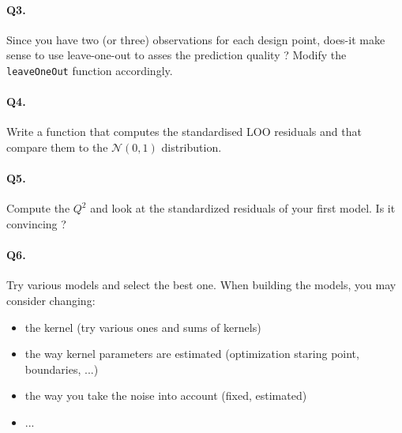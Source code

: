 \documentclass[12pt]{scrartcl}
\begin{document}
\paragraph{Q3.} 
Since you have two (or three) observations for each design point, does-it make sense to use leave-one-out to asses the prediction quality ? Modify the \texttt{leaveOneOut} function accordingly.

\paragraph{Q4.} 
Write a function that computes the standardised LOO residuals and that compare them to the $\mathcal{N}(0,1)$ distribution.

\paragraph{Q5.} Compute the $Q^2$ and look at the standardized residuals of your first model. Is it convincing ?

\paragraph{Q6.} Try various models and select the best one. When building the models, you may consider changing:
\begin{itemize}
   	\item the kernel (try various ones and sums of kernels)
   	\item the way kernel parameters are estimated (optimization staring point, boundaries, ...)
   	\item the way you take the noise into account (fixed, estimated)
   	\item ...
\end{itemize}   
\end{document}
